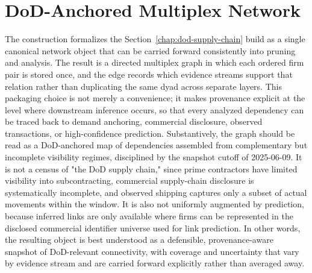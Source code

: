 \section{DoD-Anchored Multiplex Network}
\label{sec:dod-multiplex}

The construction formalizes the Section~\ref{chap:dod-supply-chain} build as a single canonical network object that can be carried forward consistently into pruning and analysis. The result is a directed multiplex graph \parencite{kivela_multilayer_2014} in which each ordered firm pair is stored once, and the edge records which evidence streams support that relation rather than duplicating the same dyad across separate layers. This packaging choice is not merely a convenience; it makes provenance explicit at the level where downstream inference occurs, so that every analyzed dependency can be traced back to demand anchoring, commercial disclosure, observed transactions, or high-confidence prediction. Substantively, the graph should be read as a DoD-anchored map of dependencies assembled from complementary but incomplete visibility regimes, disciplined by the snapshot cutoff of 2025-06-09. It is not a census of "the DoD supply chain," since prime contractors have limited visibility into subcontracting, commercial supply-chain disclosure is systematically incomplete, and observed shipping captures only a subset of actual movements within the window. It is also not uniformly augmented by prediction, because inferred links are only available where firms can be represented in the disclosed commercial identifier universe used for link prediction. In other words, the resulting object is best understood as a defensible, provenance-aware snapshot of DoD-relevant connectivity, with coverage and uncertainty that vary by evidence stream and are carried forward explicitly rather than averaged away.

